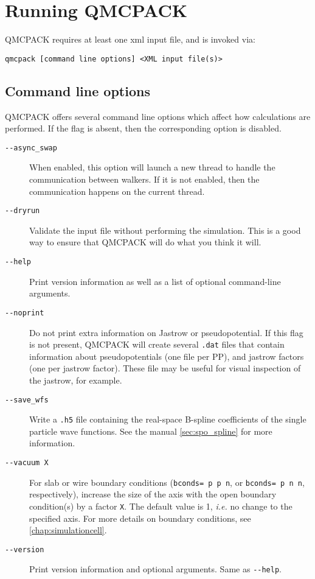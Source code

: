 \chapter{Running QMCPACK}
\label{chap:running}

QMCPACK requires at least one xml input file, and is invoked via:

{\texttt{qmcpack [command line options] <XML input file(s)>}}

\section{Command line options}
\label{sec:commandline}
QMCPACK offers several command line options which affect how calculations
are performed. If the flag is absent, then the corresponding
option is disabled.

\begin{description}
\item[\texttt{-{}-async\_swap}]{ When enabled, this option will launch a new thread
  to handle the communication between walkers. If it is not enabled,
  then the communication happens on the current thread. }
\item[\texttt{-{}-dryrun}]{ Validate the input file without performing the simulation.
  This is a good way to ensure that QMCPACK will do what you think it will. }
\item[\texttt{-{}-help}]{ Print version information as well as a list of optional
  command-line arguments. }
\item[\texttt{-{}-noprint}]{ Do not print extra information on Jastrow or pseudopotential.
  If this flag is not present, QMCPACK will create several \texttt{.dat} files
  that contain information about pseudopotentials (one file per PP), and jastrow
  factors (one per jastrow factor). These file may be useful for visual inspection
  of the jastrow, for example. }
\item[\texttt{-{}-save\_wfs}]{ Write a \texttt{.h5} file containing the real-space B-spline
  coefficients of the single particle wave functions. See the manual
  \ref{sec:spo_spline} for more information.}
\item[\texttt{-{}-vacuum X}]{ For slab or wire boundary conditions
  (\texttt{bconds= p p n}, or \texttt{bconds= p n n}, respectively),
  increase the size of the axis with the open boundary condition(s)
  by a factor \texttt{X}. The default value is 1,
  \textit{i.e.} no change to the specified axis. For more details
  on boundary conditions, see \ref{chap:simulationcell}. }
\item[\texttt{-{}-version}]{ Print version information and optional arguments.
  Same as \texttt{-{}-help}. }
\end{description}




